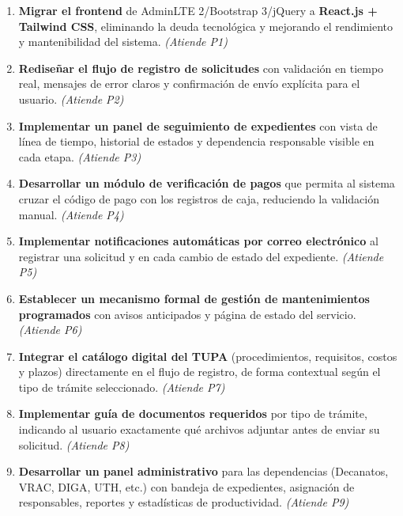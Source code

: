 \begin{enumerate}
    \item \textbf{Migrar el frontend} de AdminLTE 2/Bootstrap 3/jQuery a \textbf{React.js + Tailwind CSS}, eliminando la deuda tecnológica y mejorando el rendimiento y mantenibilidad del sistema. \textit{(Atiende P1)}
 
    \item \textbf{Rediseñar el flujo de registro de solicitudes} con validación en tiempo real, mensajes de error claros y confirmación de envío explícita para el usuario. \textit{(Atiende P2)}
 
    \item \textbf{Implementar un panel de seguimiento de expedientes} con vista de línea de tiempo, historial de estados y dependencia responsable visible en cada etapa. \textit{(Atiende P3)}
 
    \item \textbf{Desarrollar un módulo de verificación de pagos} que permita al sistema cruzar el código de pago con los registros de caja, reduciendo la validación manual. \textit{(Atiende P4)}
 
    \item \textbf{Implementar notificaciones automáticas por correo electrónico} al registrar una solicitud y en cada cambio de estado del expediente. \textit{(Atiende P5)}
 
    \item \textbf{Establecer un mecanismo formal de gestión de mantenimientos programados} con avisos anticipados y página de estado del servicio. \textit{(Atiende P6)}
 
    \item \textbf{Integrar el catálogo digital del TUPA} (procedimientos, requisitos, costos y plazos) directamente en el flujo de registro, de forma contextual según el tipo de trámite seleccionado. \textit{(Atiende P7)}
 
    \item \textbf{Implementar guía de documentos requeridos} por tipo de trámite, indicando al usuario exactamente qué archivos adjuntar antes de enviar su solicitud. \textit{(Atiende P8)}
 
    \item \textbf{Desarrollar un panel administrativo} para las dependencias (Decanatos, VRAC, DIGA, UTH, etc.) con bandeja de expedientes, asignación de responsables, reportes y estadísticas de productividad. \textit{(Atiende P9)}
\end{enumerate}